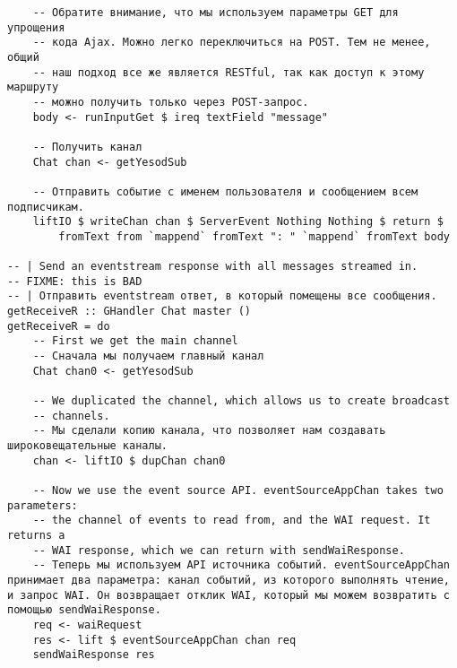 \begin{lstlisting}
    -- Обратите внимание, что мы используем параметры GET для упрощения
    -- кода Ajax. Можно легко переключиться на POST. Тем не менее, общий 
    -- наш подход все же является RESTful, так как доступ к этому маршруту
    -- можно получить только через POST-запрос.
    body <- runInputGet $ ireq textField "message"

    -- Получить канал
    Chat chan <- getYesodSub

    -- Отправить событие с именем пользователя и сообщением всем подписчикам.
    liftIO $ writeChan chan $ ServerEvent Nothing Nothing $ return $
        fromText from `mappend` fromText ": " `mappend` fromText body

-- | Send an eventstream response with all messages streamed in.
-- FIXME: this is BAD
-- | Отправить eventstream ответ, в который помещены все сообщения.
getReceiveR :: GHandler Chat master ()
getReceiveR = do
    -- First we get the main channel
    -- Сначала мы получаем главный канал
    Chat chan0 <- getYesodSub

    -- We duplicated the channel, which allows us to create broadcast
    -- channels.
    -- Мы сделали копию канала, что позволяет нам создавать широковещательные каналы.
    chan <- liftIO $ dupChan chan0

    -- Now we use the event source API. eventSourceAppChan takes two parameters:
    -- the channel of events to read from, and the WAI request. It returns a
    -- WAI response, which we can return with sendWaiResponse.
    -- Теперь мы используем API источника событий. eventSourceAppChan принимает два параметра: канал событий, из которого выполнять чтение, и запрос WAI. Он возвращает отклик WAI, который мы можем возвратить с помощью sendWaiResponse.
    req <- waiRequest
    res <- lift $ eventSourceAppChan chan req
    sendWaiResponse res


\end{lstlisting}
